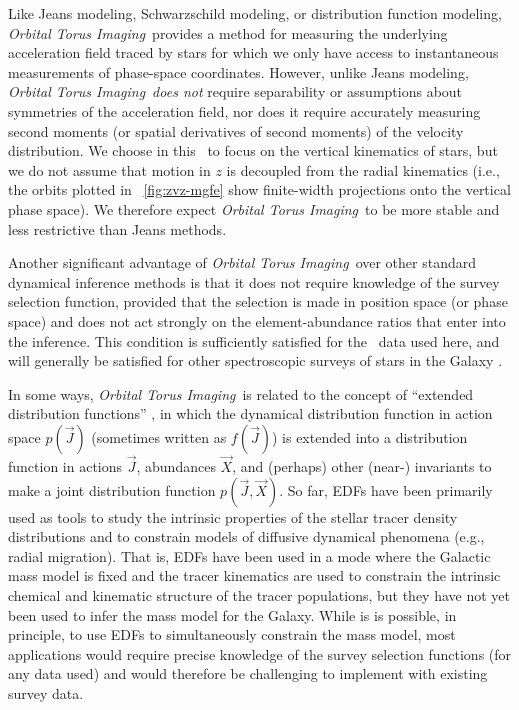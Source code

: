 \documentclass[modern]{aastex63}
\newcommand{\methodname}{\textsl{Orbital Torus Imaging}}
\newcommand{\apogee}{\acronym{APOGEE}}
\begin{document}
Like Jeans modeling, Schwarzschild modeling, or distribution function modeling,
\methodname\ provides a method for measuring the underlying acceleration field
traced by stars for which we only have access to instantaneous measurements of
phase-space coordinates.
However, unlike Jeans modeling, \methodname\ \emph{does not} require
separability or assumptions about symmetries of the acceleration field, nor does
it require accurately measuring second moments (or spatial derivatives of second
moments) of the velocity distribution.
We choose in this \documentname\ to focus on the vertical kinematics of stars,
but we do not assume that motion in $z$ is decoupled from the radial kinematics
(i.e., the orbits plotted in \figurename~\ref{fig:zvz-mgfe} show finite-width
projections onto the vertical phase space).
We therefore expect \methodname\ to be more stable and less restrictive than
Jeans methods.

Another significant advantage of \methodname\ over other standard dynamical
inference methods is that it does not require knowledge of the survey selection
function, provided that the selection is made in position space (or phase space)
and does not act strongly on the element-abundance ratios that enter into the
inference.
This condition is sufficiently satisfied for the \apogee\ data used here, and
will generally be satisfied for other spectroscopic surveys of stars in the
Galaxy \citep[e.g., ;][]{Martell:2017, Buder:2018}.

In some ways, \methodname\ is related to the concept of ``extended distribution
functions'' \citep[EDFs; e.g.,][]{Sanders:2015,Das:2016}, in which the dynamical
distribution function in action space $p(\vec{J})$ (sometimes written as
$f(\vec{J})$) is extended into a distribution function in actions $\vec{J}$,
abundances $\vec{X}$, and (perhaps) other (near-) invariants to make a joint
distribution function $p(\vec{J},\vec{X})$.
So far, EDFs have been primarily used as tools to study the intrinsic properties
of the stellar tracer density distributions and to constrain models of diffusive
dynamical phenomena (e.g., radial migration).
That is, EDFs have been used in a mode where the Galactic mass model is fixed
and the tracer kinematics are used to constrain the intrinsic chemical and
kinematic structure of the tracer populations, but they have not yet been used
to infer the mass model for the Galaxy.
While is is possible, in principle, to use EDFs to simultaneously constrain the
mass model, most applications would require precise knowledge of the survey
selection functions (for any data used) and would therefore be challenging to
implement with existing survey data.
\end{document}
